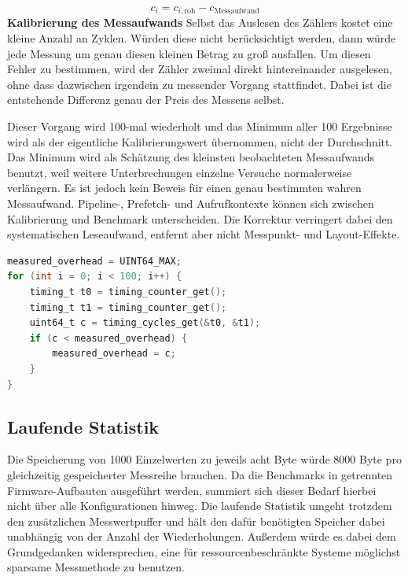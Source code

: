 \[c_i = c_{i,\mathrm{roh}} - c_{\mathrm{Messaufwand}}\]
\textbf{Kalibrierung des Messaufwands }Selbst das Auslesen des Z{\"a}hlers kostet eine kleine Anzahl an Zyklen. W{\"u}rden diese nicht ber{\"u}cksichtigt werden, dann w{\"u}rde jede Messung um genau diesen kleinen Betrag zu gro{\ss} ausfallen. Um diesen Fehler zu bestimmen, wird der Z{\"a}hler zweimal direkt hintereinander ausgelesen, ohne dass dazwischen irgendein zu messender Vorgang stattfindet. Dabei ist die entstehende Differenz genau der Preis des Messens selbst.

Dieser Vorgang wird 100-mal wiederholt und das Minimum aller 100 Ergebnisse wird als der eigentliche Kalibrierungswert {\"u}bernommen, nicht der Durchschnitt. Das Minimum wird als Sch{\"a}tzung des kleinsten beobachteten Messaufwands benutzt, weil weitere Unterbrechungen einzelne Versuche normalerweise verl{\"a}ngern. Es ist jedoch kein Beweis f{\"u}r einen genau bestimmten wahren Messaufwand. Pipeline-, Prefetch- und Aufrufkontexte k{\"o}nnen sich zwischen Kalibrierung und Benchmark unterscheiden. Die Korrektur verringert dabei den systematischen Leseaufwand, entfernt aber nicht Messpunkt- und Layout-Effekte.

\begin{lstlisting}[style=basecode,language=C]
measured_overhead = UINT64_MAX;
for (int i = 0; i < 100; i++) {
    timing_t t0 = timing_counter_get();
    timing_t t1 = timing_counter_get();
    uint64_t c = timing_cycles_get(&t0, &t1);
    if (c < measured_overhead) {
        measured_overhead = c;
    }
}
\end{lstlisting}
\subsection{Laufende Statistik}
Die Speicherung von 1000 Einzelwerten zu jeweils acht Byte w{\"u}rde 8000 Byte pro gleichzeitig gespeicherter Messreihe brauchen. Da die Benchmarks in getrennten Firmware-Aufbauten ausgef{\"u}hrt werden, summiert sich dieser Bedarf hierbei nicht {\"u}ber alle Konfigurationen hinweg. Die laufende Statistik umgeht trotzdem den zus{\"a}tzlichen Messwertpuffer und h{\"a}lt den daf{\"u}r ben{\"o}tigten Speicher dabei unabh{\"a}ngig von der Anzahl der Wiederholungen. Au{\ss}erdem w{\"u}rde es dabei dem Grundgedanken widersprechen, eine f{\"u}r ressourcenbeschr{\"a}nkte Systeme m{\"o}glichst sparsame Messmethode zu benutzen.


